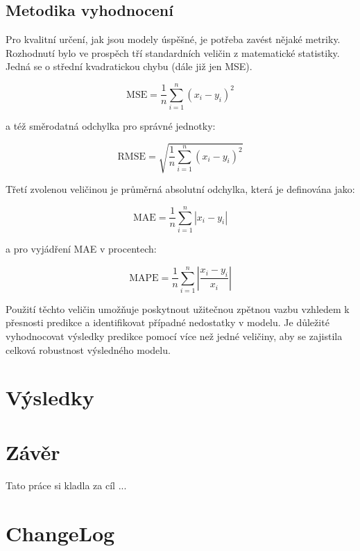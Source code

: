 \documentclass[FM,BP,fonts]{tulthesis}
\begin{document}
\newpage
\section{Metodika vyhodnocení}\label{section:error-matrix}
Pro kvalitní určení, jak jsou modely úspěšné, je potřeba zavést nějaké metriky. Rozhodnutí bylo ve prospěch tří standardních veličin z matematické statistiky. Jedná se o střední kvadratickou chybu (dále již jen MSE). 

\begin{equation}
	\text{MSE} = \frac{1}{n}\sum_{i=1}^{n}(x_i-y_i)^2 
\end{equation}

a též směrodatná odchylka pro správné jednotky:

\begin{equation}
	\text{RMSE} = \sqrt{\frac{1}{n}\sum_{i=1}^{n}(x_i-y_i)^2}
\end{equation}

Třetí zvolenou veličinou je průměrná absolutní odchylka, která je definována jako:

\begin{equation}
	\text{MAE} = \frac{1}{n}\sum_{i=1}^{n}|x_i-y_i| 
\end{equation}

a pro vyjádření MAE v procentech: 

\begin{equation}
	\text{MAPE} = \frac{1}{n}\sum_{i=1}^{n}|\frac{x_i-y_i}{x_i}| 
\end{equation}

Použití těchto veličin umožňuje poskytnout užitečnou zpětnou vazbu vzhledem k přesnosti predikce a identifikovat případné nedostatky v modelu. Je důležité vyhodnocovat výsledky predikce pomocí více než jedné veličiny, aby se zajistila celková robustnost výsledného modelu.


\chapter{Výsledky}\label{Výsledky}



\chapter{Závěr}
Tato práce si kladla za cíl ... 

\chapter{ChangeLog}
\end{document}
